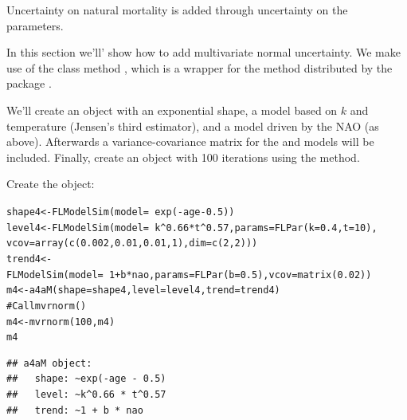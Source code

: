 \documentclass[a4paper,english,10pt]{article}\usepackage[]{graphicx}\usepackage[]{color}
\makeatletter
\newcommand{\hlnum}[1]{\textcolor[rgb]{0.063,0.58,0.627}{#1}}%
\newcommand{\hlcom}[1]{\textcolor[rgb]{0.588,0.588,0.588}{#1}}%
\newcommand{\hlopt}[1]{\textcolor[rgb]{0.196,0.196,0.196}{#1}}%
\newcommand{\hlstd}[1]{\textcolor[rgb]{0.196,0.196,0.196}{#1}}%
\newcommand{\hlkwb}[1]{\textcolor[rgb]{0.627,0,0.314}{#1}}%
\newcommand{\hlkwc}[1]{\textcolor[rgb]{0,0.631,0.314}{#1}}%
\newcommand{\hlkwd}[1]{\textcolor[rgb]{0.78,0.227,0.412}{#1}}%
\newenvironment{kframe}{%
 \def\at@end@of@kframe{}%
 \ifinner\ifhmode%
  \def\at@end@of@kframe{\end{minipage}}%
  \begin{minipage}{\columnwidth}%
 \fi\fi%
 \def\FrameCommand##1{\hskip\@totalleftmargin \hskip-\fboxsep
 \colorbox{shadecolor}{##1}\hskip-\fboxsep
     \hskip-\linewidth \hskip-\@totalleftmargin \hskip\columnwidth}%
 \MakeFramed {\advance\hsize-\width
   \@totalleftmargin\z@ \linewidth\hsize
   \@setminipage}}%
 {\par\unskip\endMakeFramed%
 \at@end@of@kframe}
\newenvironment{knitrout}{}{} %
\makeatother
\begin{document}
Uncertainty on natural mortality is added through uncertainty on the parameters.

In this section we'll' show how to add multivariate normal uncertainty. We make use of the class  method , which is a wrapper for the method  distributed by the package .

We'll create an  object with an exponential shape, a  model based on $k$ and temperature (Jensen's third estimator), and a  model driven by the NAO (as above). Afterwards a variance-covariance matrix for the  and  models will be included. Finally, create an object with 100 iterations using the  method.

Create the object:

\begin{knitrout}
\color{fgcolor}\begin{kframe}
\begin{alltt}
\hlstd{shape4} \hlkwb{<-} \hlkwd{FLModelSim}\hlstd{(}\hlkwc{model} \hlstd{=} \hlopt{~}\hlkwd{exp}\hlstd{(}\hlopt{-}\hlstd{age} \hlopt{-} \hlnum{0.5}\hlstd{))}
\hlstd{level4} \hlkwb{<-} \hlkwd{FLModelSim}\hlstd{(}\hlkwc{model} \hlstd{=} \hlopt{~}\hlstd{k}\hlopt{^}\hlnum{0.66} \hlopt{*} \hlstd{t}\hlopt{^}\hlnum{0.57}\hlstd{,} \hlkwc{params} \hlstd{=} \hlkwd{FLPar}\hlstd{(}\hlkwc{k} \hlstd{=} \hlnum{0.4}\hlstd{,} \hlkwc{t} \hlstd{=} \hlnum{10}\hlstd{),}
    \hlkwc{vcov} \hlstd{=} \hlkwd{array}\hlstd{(}\hlkwd{c}\hlstd{(}\hlnum{0.002}\hlstd{,} \hlnum{0.01}\hlstd{,} \hlnum{0.01}\hlstd{,} \hlnum{1}\hlstd{),} \hlkwc{dim} \hlstd{=} \hlkwd{c}\hlstd{(}\hlnum{2}\hlstd{,} \hlnum{2}\hlstd{)))}
\hlstd{trend4} \hlkwb{<-} \hlkwd{FLModelSim}\hlstd{(}\hlkwc{model} \hlstd{=} \hlopt{~}\hlnum{1} \hlopt{+} \hlstd{b} \hlopt{*} \hlstd{nao,} \hlkwc{params} \hlstd{=} \hlkwd{FLPar}\hlstd{(}\hlkwc{b} \hlstd{=} \hlnum{0.5}\hlstd{),} \hlkwc{vcov} \hlstd{=} \hlkwd{matrix}\hlstd{(}\hlnum{0.02}\hlstd{))}
\hlstd{m4} \hlkwb{<-} \hlkwd{a4aM}\hlstd{(}\hlkwc{shape} \hlstd{= shape4,} \hlkwc{level} \hlstd{= level4,} \hlkwc{trend} \hlstd{= trend4)}
\hlcom{# Call mvrnorm()}
\hlstd{m4} \hlkwb{<-} \hlkwd{mvrnorm}\hlstd{(}\hlnum{100}\hlstd{, m4)}
\hlstd{m4}
\end{alltt}
\begin{verbatim}
## a4aM object:
##   shape: ~exp(-age - 0.5)
##   level: ~k^0.66 * t^0.57
##   trend: ~1 + b * nao
\end{verbatim}
\end{kframe}
\end{knitrout}
\end{document}
